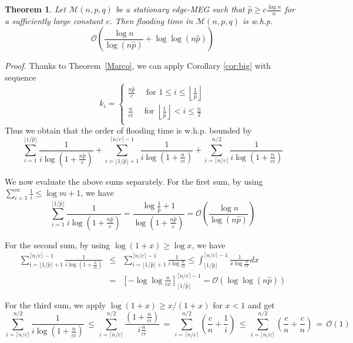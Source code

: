 \documentclass[10pt,a4paper]{article}
\newtheorem{theorem}[definition]{Theorem}
\newcommand{\proof}{\noindent\textit{Proof. }}
\newcommand{\qed}{\hspace{\stretch{1}$\square$}}
\begin{document}
\begin{theorem}\label{theorem:ubedge} Let $\mathcal{M}(n,p,q)$ be a stationary edge-MEG such that $\hat{p} \geqslant c \frac{\log n}{n} $ for a sufficiently large constant $c$. Then flooding time in $\mathcal{M}(n,p,q)$ is w.h.p.
$$
\mathcal{O}\left(\frac{\log n}{\log(n\hat{p})}  + \log \log (n\hat{p})\right)
$$
\end{theorem}
\proof Thanks to Theorem~\ref{Marco}, we can apply Corollary \ref{cor:big} with sequence
$$
k_i=\left\{\begin{array}{l}
\frac{n\hat{p}}{c} \quad \mbox{ for $1\leqslant i\leqslant \left\lfloor \frac{1}{\hat{p}}\right\rfloor$}\\
\frac{n}{ci}\quad \mbox { for $\left\lfloor\frac{1}{\hat{p}}\right\rfloor < i\leqslant  \frac{n}{2}$}\\
\end{array}
\right.
$$
Thus we obtain that the order of flooding time is w.h.p. bounded by
$$
\sum_{i=1}^{\lfloor 1/\hat{p}\rfloor} \frac{1}{i\log (1 + \frac{n\hat{p}}{c})}+
\sum_{i=\lfloor 1/\hat{p}\rfloor+1}^{\lceil n/c\rceil-1} \frac{1}{i\log (1 + \frac{n}{ci})}
+ \sum_{i=\lceil n/c\rceil}^{n/2} \frac{1}{i\log (1 + \frac{n}{ci})}
$$

\noindent We now evaluate the above sums separately. For the first sum, by using
$\sum_{i=1}^{m}\frac{1}{i}\leqslant \log m+1$, we have
$$
\sum_{i=1}^{\lfloor 1/\hat{p}\rfloor} \frac{1}{i\log (1 + \frac{n\hat{p}}{c})}=
\frac{\log\frac{1}{\hat{p}}+1}{\log (1 + \frac{n\hat{p}}{c})}= \mathcal{O}\left(\frac{\log
n}{\log(n\hat{p})} \right)
$$

\noindent For the second sum, by using  $\log (1+x) \geqslant \log x$, we have
\begin{eqnarray*}
\sum_{i=\lfloor 1/\hat{p}\rfloor+1}^{\lceil n/c\rceil-1} \frac{1}{i\log (1 + \frac{n}{ci})}
& \leqslant & \sum_{i=\lfloor 1/\hat{p}\rfloor+1}^{\lceil n/c\rceil-1}\frac{1}{i\log \frac{n}{ci}}
\leqslant \int_{\lfloor1/\hat{p}\rfloor}^{\lceil n/c\rceil-1} \frac{1}{x\log \frac{n}{cx}}dx \\
& = & \left[-\log\log\frac{n}{cx}\right]_{\lfloor1/\hat{p}\rfloor}^{\lceil n/c\rceil-1} = \mathcal{O}(\log\log ( n\hat{p}))
\end{eqnarray*}

\noindent For the third sum, we apply $\log (1+x)\geqslant x/(1+x)$ for $x<1$ and get
$$
\sum_{i=\lceil n/c\rceil}^{n/2} \frac{1}{i\log (1 + \frac{n}{ci})}
\, \leqslant \, \sum_{i=\lceil n/c\rceil}^{n/2}\frac{\left(1+\frac{n}{ci}\right)}{i\frac{n}{ci}}
\, = \, \sum_{i=\lceil n/c\rceil}^{n/2} \left(\frac{c}{n}+\frac{1}{i}\right)
\, \leqslant \, \sum_{i=\lceil n/c\rceil}^{n/2} \left(\frac{c}{n}+\frac{c}{n}\right)
\, = \, \mathcal{O}(1)
$$
\qed
\end{document}
